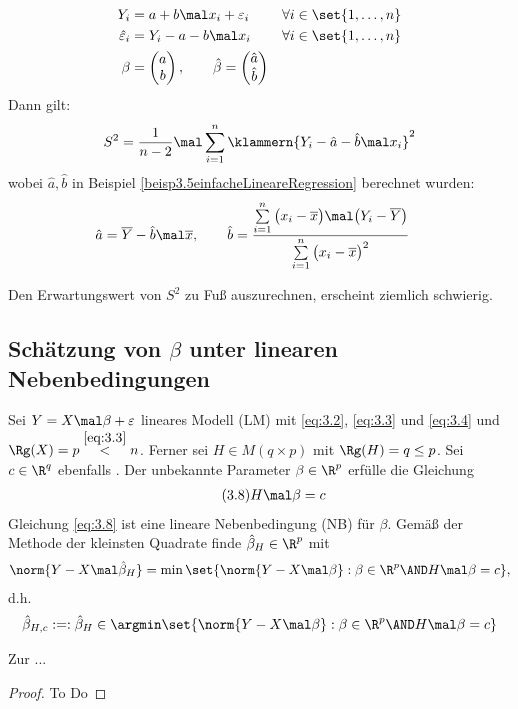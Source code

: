 \begin{beispiel}\label{beisp3.14einfacheLinareRegression}
	\begin{align*}
		Y_i&=a+b\mal x_i+\varepsilon_i &&\forall i\in\set{1,\ldots,n}\\
		\hat{\varepsilon}_i&=Y_i-a-b\mal x_i&&\forall i\in\set{1,\ldots,n}\\
		\beta&=\begin{pmatrix}
			a\\
			b
		\end{pmatrix},\qquad \hat{\beta}=\begin{pmatrix}
			\hat{a}\\
			\hat{b}
		\end{pmatrix}
	\end{align*}
	Dann gilt:
	\begin{align*}
		S^2=\frac{1}{n-2}\mal\sum\limits_{i=1}^n\klammern{Y_i-\hat{a}-\hat{b}\mal x_i}^2
	\end{align*}
	wobei $\hat{a},\hat{b}$ in Beispiel \ref{beisp3.5einfacheLineareRegression} berechnet wurden:
	\begin{align*}
		\hat{a}&=\overline{Y}-\hat{b}\mal\overline{x},\qquad
		\hat{b}=\frac{\sum\limits_{i=1}^n\big(x_i-\overline{x}\big)\mal\big(Y_i-\overline{Y}\big)}{\sum\limits_{i=1}^n\big(x_i-\overline{x}\big)^2}
	\end{align*}
	
	\begin{bemerkung}
		Den Erwartungswert von $S^2$ zu Fuß auszurechnen, erscheint ziemlich schwierig.
	\end{bemerkung}
\end{beispiel}

\subsection{Schätzung von \texorpdfstring{$\beta$}{Beta} unter linearen Nebenbedingungen} %

Sei $Y=X\mal\beta+\varepsilon$ lineares Modell (LM) mit \eqref{eq:3.2}, \eqref{eq:3.3} und \eqref{eq:3.4} und $\Rg(X)=p\overset{\eqref{eq:3.3}}{<}n$.
Ferner sei $H\in M(q\times p)$  mit $\Rg(H)=q\leq p$.
Sei $c\in\R^q$ ebenfalls .
Der unbekannte Parameter $\beta\in\R^p$ erfülle die Gleichung
\begin{align}\label{eq:3.8}\tag{3.8}
	H\mal\beta=c
\end{align}
Gleichung \eqref{eq:3.8} ist eine lineare Nebenbedingung (NB) für $\beta$.
Gemäß der Methode der kleinsten Quadrate finde $\hat{\beta}_H\in\R^p$ mit
\begin{align*}
	\norm{Y-X\mal\hat{\beta}_H}=\min\set{\norm{Y-X\mal\beta}:\beta\in\R^p\AND   H\mal\beta=c},
\end{align*}
d.h. 
\begin{align*}
	\hat{\beta}_{H,c}:=:\hat{\beta}_H\in\argmin\set{\norm{Y-X\mal\beta}:\beta\in\R^p\AND H\mal\beta=c}
\end{align*}

Zur  ...

\begin{satz}\label{satz3.15}

\end{satz}

\begin{proof}
	To Do
\end{proof}
